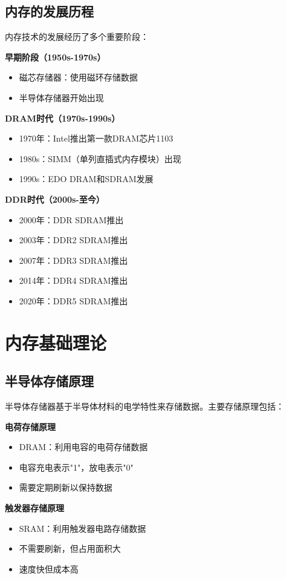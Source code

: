 \documentclass{article}
\begin{document}
\subsection{内存的发展历程}

内存技术的发展经历了多个重要阶段：

\textbf{早期阶段（1950s-1970s）}
\begin{itemize}
    \item 磁芯存储器：使用磁环存储数据
    \item 半导体存储器开始出现
\end{itemize}

\textbf{DRAM时代（1970s-1990s）}
\begin{itemize}
    \item 1970年：Intel推出第一款DRAM芯片1103
    \item 1980s：SIMM（单列直插式内存模块）出现
    \item 1990s：EDO DRAM和SDRAM发展
\end{itemize}

\textbf{DDR时代（2000s-至今）}
\begin{itemize}
    \item 2000年：DDR SDRAM推出
    \item 2003年：DDR2 SDRAM推出
    \item 2007年：DDR3 SDRAM推出
    \item 2014年：DDR4 SDRAM推出
    \item 2020年：DDR5 SDRAM推出
\end{itemize}

\section{内存基础理论}

\subsection{半导体存储原理}

半导体存储器基于半导体材料的电学特性来存储数据。主要存储原理包括：

\textbf{电荷存储原理}
\begin{itemize}
    \item DRAM：利用电容的电荷存储数据
    \item 电容充电表示"1"，放电表示"0"
    \item 需要定期刷新以保持数据
\end{itemize}

\textbf{触发器存储原理}
\begin{itemize}
    \item SRAM：利用触发器电路存储数据
    \item 不需要刷新，但占用面积大
    \item 速度快但成本高
\end{itemize}
\end{document}

